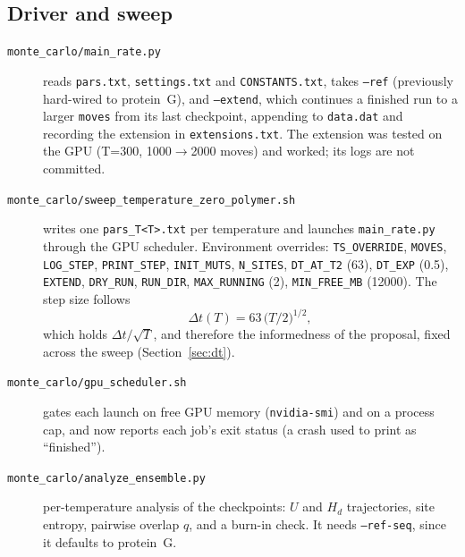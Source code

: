\documentclass[11pt,a4paper]{article}
\newcommand{\dt}{\Delta t}
\newcommand{\Hd}{H_d}
\newcommand{\file}[1]{\texttt{#1}}
\begin{document}
\subsection{Driver and sweep}
\begin{description}
  \item[\file{monte\_carlo/main\_rate.py}] reads \file{pars.txt},
        \file{settings.txt} and \file{CONSTANTS.txt}, takes \texttt{--ref}
        (previously hard-wired to protein~G), and \texttt{--extend}, which
        continues a finished run to a larger \texttt{moves} from its last
        checkpoint, appending to \file{data.dat} and recording the extension in
        \file{extensions.txt}. The extension was tested on the GPU (T=300,
        1000$\to$2000 moves) and worked; its logs are not committed.
  \item[\file{monte\_carlo/sweep\_temperature\_zero\_polymer.sh}] writes one
        \file{pars\_T<T>.txt} per temperature and launches \file{main\_rate.py}
        through the GPU scheduler. Environment overrides: \texttt{TS\_OVERRIDE},
        \texttt{MOVES}, \texttt{LOG\_STEP}, \texttt{PRINT\_STEP},
        \texttt{INIT\_MUTS}, \texttt{N\_SITES}, \texttt{DT\_AT\_T2} (63),
        \texttt{DT\_EXP} (0.5), \texttt{EXTEND}, \texttt{DRY\_RUN},
        \texttt{RUN\_DIR}, \texttt{MAX\_RUNNING} (2), \texttt{MIN\_FREE\_MB}
        (12000). The step size follows
        \begin{equation}\label{eq:dt}
          \dt(T) = 63\,\bigl(T/2\bigr)^{1/2},
        \end{equation}
        which holds $\dt/\sqrt{T}$, and therefore the informedness of the
        proposal, fixed across the sweep (Section~\ref{sec:dt}).
  \item[\file{monte\_carlo/gpu\_scheduler.sh}] gates each launch on free GPU
        memory (\texttt{nvidia-smi}) and on a process cap, and now reports each
        job's exit status (a crash used to print as ``finished'').
  \item[\file{monte\_carlo/analyze\_ensemble.py}] per-temperature analysis of
        the checkpoints: $U$ and $\Hd$ trajectories, site entropy, pairwise
        overlap $q$, and a burn-in check. It needs \texttt{--ref-seq}, since it
        defaults to protein~G.
\end{description}
\end{document}
